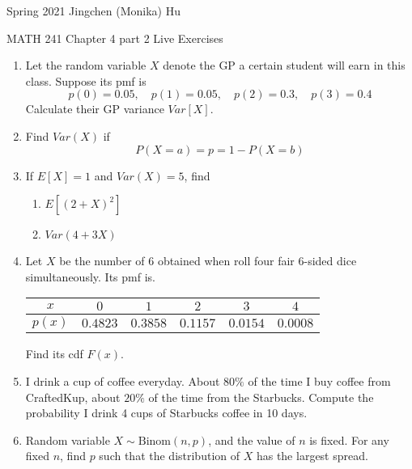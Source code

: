 \documentclass[11pt]{article}
\begin{document}
\enlargethispage{\baselineskip}

Spring 2021 \hfill Jingchen (Monika) Hu\\

\begin{center}
{\huge MATH 241 Chapter 4 part 2 Live Exercises}	\\
\end{center}
\vspace{0.5cm}

\begin{enumerate}


\item Let the random variable $X$ denote the GP a certain student will earn in this class. Suppose its pmf is
\[ p(0) = 0.05, \quad p(1) = 0.05, \quad p(2) = 0.3, \quad p(3) = 0.4\]
Calculate their GP variance $Var[X]$.

\item Find $Var(X)$ if
\[
P(X = a) = p = 1 - P(X = b)
\]

\item If $E[X] = 1$ and $Var(X) = 5$, find 
\begin{enumerate}
\item $E[(2 + X)^2]$
\item $Var(4 + 3X)$
\end{enumerate}


\item Let $X$ be the number of 6 obtained when roll four fair 6-sided dice simultaneously.
Its pmf is.
\begin{center}
\begin{tabular}{c | c | c | c | c | c }
$x$				& $0$			& $1$			& $2$			& $3$			& $4$			\\
\hline
$p(x)$			&$0.4823$		&$0.3858$ 		&$0.1157$ 		&$0.0154$ 		&$0.0008$ 	\\
\end{tabular}
\end{center}
Find its cdf $F(x)$.

\item I drink a cup of coffee everyday. About $80\%$ of the time I buy coffee from CraftedKup,
about $20\%$ of the time from the Starbucks. Compute the probability I drink 4 cups of Starbucks coffee in 10 days.

\item Random variable $X \sim \text{Binom}(n,p)$, and the value of $n$ is fixed.
For any fixed $n$, find $p$ such that the distribution of $X$ has the largest spread.

\end{enumerate}
\end{document}
